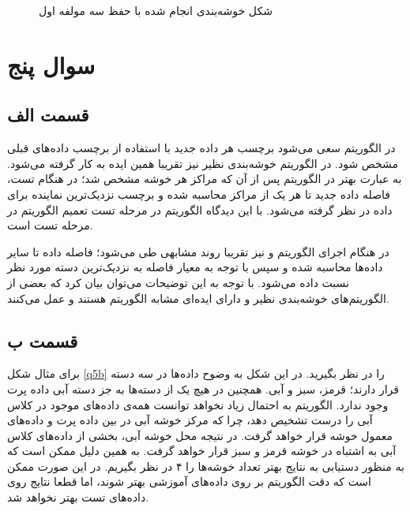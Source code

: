 \documentclass[12pt, a4paper]{article}
\begin{document}
\begin{figure}[h]
\begin{subfigure}{0.3\linewidth}
    \end{subfigure}
    \caption{شکل خوشه‌بندی انجام شده با حفظ سه مولفه اول}
    \label{casting_271d_to_3d}
\end{figure}

\clearpage
\thispagestyle{fancy}

\section*{سوال پنج}

\subsection*{قسمت الف}

در الگوریتم  سعی می‌شود برچسب هر داده جدید با استفاده از برچسب داده‌های
قبلی مشخص شود. در الگوریتم خوشه‌بندی نظیر  نیز تقریبا همین ایده به کار
گرفته می‌شود. به عبارت بهتر در الگوریتم  پس از آن که مراکز هر خوشه
مشخص شد؛ در هنگام تست، فاصله داده جدید تا هر یک از مراکز محاسبه شده
و برچسب نزدیک‌ترین نماینده برای داده در نظر گرفته می‌شود.
با این دیدگاه الگوریتم  در مرحله تست تعمیم الگوریتم  در
مرحله تست است.

در هنگام اجرای الگوریتم  و  نیز
تقریبا روند مشابهی طی می‌شود؛ فاصله داده تا سایر داده‌ها محاسبه شده و سپس
با توجه به معیار فاصله به نزدیک‌ترین دسته مورد نظر نسبت داده می‌شود. با توجه به
این توضیحات می‌توان بیان کرد که بعضی از الگوریتم‌های خوشه‌بندی نظیر
 و  دارای ایده‌ای مشابه الگوریتم
 هستند و  عمل می‌کنند.

\subsection*{قسمت ب}

برای مثال شکل \ref{q5b} را در نظر بگیرید. در این شکل به وضوح داده‌ها در سه
دسته قرار دارند؛ قرمز، سبز و آبی. همچنین در هیچ یک از دسته‌ها به جز دسته آبی
داده پرت وجود ندارد. الگوریتم  به احتمال زیاد
نخواهد توانست همه‌ی داده‌های موجود در کلاس آبی را درست تشخیص دهد، چرا
که مرکز خوشه آبی در بین داده پرت و داده‌های معمول خوشه قرار خواهد گرفت.
در نتیجه محل خوشه آبی، بخشی از داده‌های کلاس آبی به اشتباه
در خوشه قرمز و سبز قرار خواهد گرفت.
به همین دلیل ممکن است که به منظور دستیابی به نتایج بهتر
تعداد خوشه‌ها را ۴ در نظر بگیریم.
در این صورت ممکن است که دقت الگوریتم بر روی داده‌های
آموزشی بهتر شوند، اما قطعا نتایج روی داده‌های تست بهتر نخواهد شد.
\end{document}
